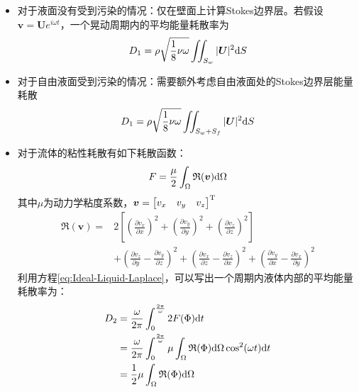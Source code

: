 \begin{enumerate}[label=\textbf{\Roman*.}, align=left, leftmargin=0pt, listparindent=\parindent, itemindent=!, labelwidth=\parindent, labelsep=0pt, itemsep=1em]
\begin{itemize}
\item 对于液面没有受到污染的情况：仅在壁面上计算Stokes边界层。若假设$\boldsymbol{v}=\boldsymbol{U}e^{i\omega t}$，一个晃动周期内的平均能量耗散率为
\begin{equation}
	D_1=\rho\sqrt{\frac{1}{8}\nu\omega}\iint_{S_w}| \boldsymbol{U}|^2\mathrm{d} S
\end{equation}
\item 对于自由液面受到污染的情况：需要额外考虑自由液面处的Stokes边界层能量耗散
\begin{equation}
	D_1=\rho\sqrt{\frac{1}{8}\nu\omega}\iint_{S_w+S_f}| \boldsymbol{U}|^2\mathrm{d} S
\end{equation}
\end{itemize}

\begin{itemize}
\item[]对于流体的粘性耗散有如下耗散函数：
\begin{equation}
	F=\frac{\mu}{2}\int_{\Omega}\mathfrak{R}(\boldsymbol{v})\mathrm{d}\Omega
\end{equation}
其中$\mu$为动力学粘度系数，$\boldsymbol{v}=\left[ \begin{matrix} v_x & v_y & v_z \end{matrix} \right]^{\mathrm{T}}$
\begin{displaymath}
	\begin{aligned}
		\mathfrak{R}(\boldsymbol{v})=&2\left[(\frac{\partial v_x}{\partial x})^2 + (\frac{\partial v_y}{\partial y})^2+ (\frac{\partial v_z}{\partial z})^2\right] \\
		&+ (\frac{\partial v_z}{\partial y}- \frac{\partial v_y}{\partial z})^2+(\frac{\partial v_x}{\partial z}- \frac{\partial v_z}{\partial x})^2 + (\frac{\partial v_y}{\partial x}- \frac{\partial v_x}{\partial y})^2
	\end{aligned}
\end{displaymath}
利用方程\eqref{eq:Ideal-Liquid-Laplace}，可以写出一个周期内液体内部的平均能量耗散率为：
\begin{equation}
	\begin{aligned}
		D_2&=\frac{\omega}{2\pi}\int_0^{\frac{2\pi}{\omega}}2F(\Phi)\mathrm{d} t \\
		&=\frac{\omega}{2\pi}\int_0^{\frac{2\pi}{\omega}}\mu\int_\Omega \mathfrak{R}(\Phi)\mathrm{d} \Omega \cos ^2 (\omega t)\mathrm{d} t \\
		&=\frac{1}{2}\mu\int_\Omega\mathfrak{R}(\Phi)\mathrm{d} \Omega
	\end{aligned}
\end{equation}
\end{itemize}
\end{enumerate}
